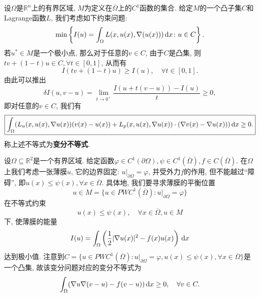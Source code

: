 设$\Omega$是$\mathbb{R}^n$上的有界区域, $M$为定义在$\overline{\Omega}$上的$C^1$函数的集合.
给定$M$的一个凸子集$C$和Lagrange函数$L$, 我们考虑如下约束问题:
\begin{equation*}
    \min\left\{I(u) = \int_{\Omega}L(x, u(x), \nabla (u(x))) \,{\rm d}x \colon u \in C\right\}. 
\end{equation*}
若$u^* \in M$是一个极小点, 那么对于任意的$v \in C$, 由于$C$是凸集, 则$tv + (1 - t)u \in C, \forall t \in [0, 1]$, 从而有 
\begin{equation*}
    I(tv + (1 - t)u) \geq I(u), \quad \forall t \in [0, 1]. 
\end{equation*}
由此可以推出 
\begin{equation*}
    \delta I(u, v - u) = \lim_{t \rightarrow 0^+}\frac{I(u + t(v - u)) - I(u)}{t} \geq 0,
\end{equation*}
即对任意的$v \in C$, 我们有 
\begin{equation*}
    \boxed{\int_{\Omega}(L_u(x, u(x), \nabla u(x))(v(x) - u(x)) + L_p(x, u(x), \nabla u(x)) \cdot (\nabla v(x) - \nabla u(x))) \,{\rm d}x \geq 0.}
\end{equation*}
称上述不等式为\textbf{变分不等式}.

\begin{example}[障碍问题]
    设$\Omega \subseteq \mathbb{R}^2$是一个有界区域. 给定函数$\varphi \in C^1(\partial\Omega), \psi \in C^1(\overline{\Omega}), f \in C(\overline{\Omega})$.
    在$\Omega$上我们考虑一张薄膜$u$, 它的边界固定: $u|_{\partial\Omega} = \varphi$, 并受外力$f$的作用, 但不能越过``障碍'', 即$u(x) \leq \psi(x), \forall x \in \overline{\Omega}$.
    具体地, 我们要寻求薄膜的平衡位置 
    \begin{equation*}
        u \in M = \{u \in PWC^1(\overline{\Omega})\colon u|_{\partial\Omega} = \varphi\}
    \end{equation*}
    在不等式约束 
    \begin{equation*}
        u(x) \leq \psi(x), \quad \forall x \in \overline{\Omega}, u \in M
    \end{equation*}
    下, 使薄膜的能量 
    \begin{equation*}
        I(u) = \int_{\Omega}\left(\frac{1}{2}|\nabla u(x)|^2 - f(x)u(x)\right) \,{\rm d}x
    \end{equation*}
    达到极小值. 注意到$C = \{u \in PWC^1(\overline{\Omega})\colon u|_{\partial\Omega} = \varphi, u(x) \leq \psi(x), \forall x \in \overline{\Omega}\}$是一个凸集, 故该变分问题对应的变分不等式为
    \begin{equation*}
        \int_{\Omega}(\nabla u\nabla(v - u) - f(v - u)) \,{\rm d}x \geq 0, \quad \forall v \in C.
    \end{equation*} 
\end{example}
